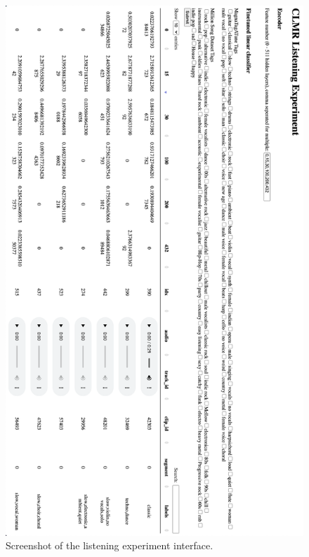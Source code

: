 \begin{figure}[h]
    \centering
    \includegraphics[width=\textwidth]{figs/listening_experiment.png}
    \caption{Screenshot of the listening experiment interface.}
    \label{fig:listening_experiment}
\end{figure}


